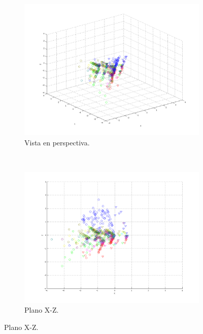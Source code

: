 \documentclass[informe.tex]{subfiles}
\begin{document}
      
      
      
      
      
      
      
      
	\begin{figure}[H]
        \centering
        \hspace*{-6.5cm}
        \begin{subfigure}[b]{0.49\textwidth}
                \includegraphics[width=\textwidth]{graficos/fold1_criterioParadap_reglaM_alpha0_rep1_0P.png}
                \caption{Vista en perspectiva.}
        \end{subfigure}%
        ~
        \begin{subfigure}[b]{0.49\textwidth}
                \includegraphics[width=\textwidth]{graficos/fold1_criterioParadap_reglaM_alpha0_rep1_1XZ.png}
                \caption{Plano X-Z.}
        \end{subfigure}
        

\end{figure}
\end{document}
